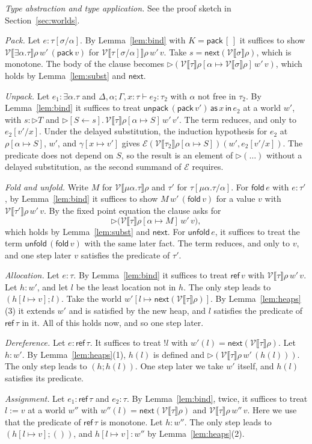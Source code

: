 \documentclass[acmsmall,nonacm,screen]{acmart}
\newcommand{\later}{{\triangleright}}
\newcommand{\nxt}{\mathsf{next}}
\newcommand{\sem}[1]{\llbracket #1 \rrbracket}
\newcommand{\kw}[1]{\mathsf{#1}}
\newcommand{\dsub}[2]{[#1 \leftarrow #2]}
\newcommand{\Pred}{T}
\newcommand{\Er}{\mathcal{E}}
\newcommand{\Vr}{\mathcal{V}}
\begin{document}
\emph{Type abstraction and type application.} See the proof sketch in
Section~\ref{sec:worlds}.

\emph{Pack.} Let $e : \tau[\sigma/\alpha]$. By Lemma~\ref{lem:bind} with
$K = \kw{pack}\,[\,]$ it suffices to show
$\Vr\sem{\exists\alpha.\tau}\rho\,w'\,(\kw{pack}\,v)$ for
$\Vr\sem{\tau[\sigma/\alpha]}\rho\,w'\,v$. Take $s = \nxt(\Vr\sem{\sigma}\rho)$, which is
monotone. The body of the clause becomes
$\later(\Vr\sem{\tau}\rho[\alpha \mapsto \Vr\sem{\sigma}\rho]\,w'\,v)$, which holds by
Lemma~\ref{lem:subst} and $\nxt$.

\emph{Unpack.} Let $e_1 : \exists\alpha.\tau$ and
$\Delta,\alpha;\Gamma,x{:}\tau \vdash e_2 : \tau_2$ with $\alpha$ not free in $\tau_2$. By
Lemma~\ref{lem:bind} it suffices to treat $\kw{unpack}\,(\kw{pack}\,v')\,\kw{as}\,x\,\kw{in}\,e_2$ at
a world $w'$, with $s : \later\Pred$ and
$\later\dsub{S}{s}.\,\Vr\sem{\tau}\rho[\alpha \mapsto S]\,w'\,v'$. The term reduces, and only
to $e_2[v'/x]$. Under the delayed substitution, the induction hypothesis for $e_2$ at
$\rho[\alpha \mapsto S]$, $w'$, and $\gamma[x \mapsto v']$ gives
$\Er(\Vr\sem{\tau_2}\rho[\alpha \mapsto S])(w',e_2[v'/x])$. The predicate does not depend on
$S$, so the result is an element of $\later(\ldots)$ without a delayed substitution, as the
second summand of $\Er$ requires.

\emph{Fold and unfold.} Write $M$ for $\Vr\sem{\mu\alpha.\tau}\rho$ and $\tau'$ for
$\tau[\mu\alpha.\tau/\alpha]$. For $\kw{fold}\,e$ with $e : \tau'$, by Lemma~\ref{lem:bind}
it suffices to show $M\,w'\,(\kw{fold}\,v)$ for a value $v$ with
$\Vr\sem{\tau'}\rho\,w'\,v$. By the fixed point equation the clause asks for
\[
  \later\bigl(\Vr\sem{\tau}\rho[\alpha \mapsto M]\,w'\,v\bigr),
\]
which holds by Lemma~\ref{lem:subst} and $\nxt$. For $\kw{unfold}\,e$, it suffices to treat
the term $\kw{unfold}\,(\kw{fold}\,v)$ with the same later fact. The term reduces, and only
to $v$, and one step later $v$ satisfies the predicate of $\tau'$.

\emph{Allocation.} Let $e : \tau$. By Lemma~\ref{lem:bind} it suffices to treat
$\kw{ref}\,v$ with $\Vr\sem{\tau}\rho\,w'\,v$. Let $h : w'$, and let $l$ be the least
location not in $h$. The only step leads to $(h[l \mapsto v];l)$. Take the world
$w'[l \mapsto \nxt(\Vr\sem{\tau}\rho)]$. By Lemma~\ref{lem:heaps}(3) it extends $w'$ and is
satisfied by the new heap, and $l$ satisfies the predicate of $\kw{ref}\,\tau$ in it. All
of this holds now, and so one step later.

\emph{Dereference.} Let $e : \kw{ref}\,\tau$. It suffices to treat ${!l}$ with
$w'(l) = \nxt(\Vr\sem{\tau}\rho)$. Let $h : w'$. By Lemma~\ref{lem:heaps}(1), $h(l)$ is
defined and $\later(\Vr\sem{\tau}\rho\,w'\,(h(l)))$. The only step leads to $(h;h(l))$. One
step later we take $w'$ itself, and $h(l)$ satisfies its predicate.

\emph{Assignment.} Let $e_1 : \kw{ref}\,\tau$ and $e_2 : \tau$. By Lemma~\ref{lem:bind},
twice, it suffices to treat $l := v$ at a world $w''$ with
$w''(l) = \nxt(\Vr\sem{\tau}\rho)$ and $\Vr\sem{\tau}\rho\,w''\,v$. Here we use that the
predicate of $\kw{ref}\,\tau$ is monotone. Let $h : w''$. The only step leads to
$(h[l \mapsto v];())$, and $h[l \mapsto v] : w''$ by Lemma~\ref{lem:heaps}(2).
\end{document}
